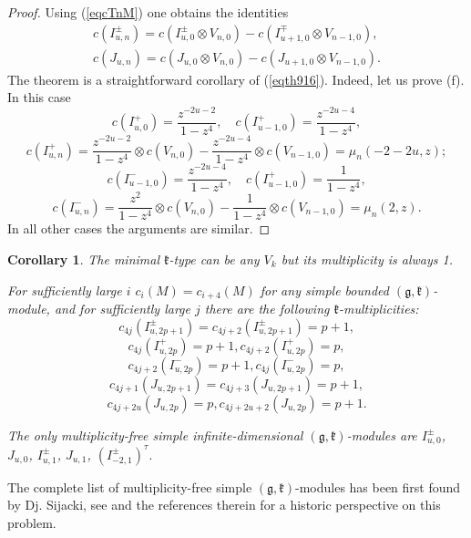 \documentclass[12pt]{amsart}
\theoremstyle{plain} %
\newtheorem{corollary}[definition]{Corollary}
\newcommand{\kk}{\mathfrak{k}}
\renewcommand{\gg}{\mathfrak{g}}
\newcommand{\refeq}[1]{(\ref{#1})}
\begin{document}
\begin{proof}
Using \refeq{eqcTnM} one obtains the identities
\begin{equation}\label{eqth916}
\begin{array}{l}
c(I^\pm_{u,n})=c(I^\pm_{u,0}\otimes V_{n,0})-c(I^\mp_{u+1,0}\otimes V_{n-1,0}),\\
c(J_{u,n})=c(J_{u,0}\otimes V_{n,0})-c(J_{u+1,0}\otimes V_{n-1,0}).
\end{array}
\end{equation}
The theorem is a straightforward corollary of \refeq{eqth916}. Indeed, let us prove (f). In this case
\[
c(I_{u,0}^+)=\frac{z^{-2u-2}}{1-z^4},\quad c(I_{u-1,0}^+)=\frac{z^{-2u-4}}{1-z^4},
\]
\[
c(I_{u,n}^+)=\frac{z^{-2u-2}}{1-z^4}\otimes c(V_{n,0})-\frac{z^{-2u-4}}{1-z^4}\otimes c(V_{n-1,0})=\mu_n(-2-2u,z);
\]
\[
c(I_{u-1,0}^-)=\frac{z^{-2u-4}}{1-z^4},\quad c(I_{u-1,0}^+)=\frac{1}{1-z^4},
\]
\[
c(I_{u,n}^-)=\frac{z^{2}}{1-z^4}\otimes c(V_{n,0})-\frac{1}{1-z^4}\otimes c(V_{n-1,0})=\mu_n(2,z).
\]
In all other cases the arguments are similar.
\end{proof}

\begin{corollary}
\item[(a)] The minimal $\kk$-type can be any $V_k$ but its multiplicity is always 1.
\item[(b)] For sufficiently large $i$ $c_i(M)=c_{i+4}(M)$ for any
  simple bounded $(\gg,\kk)$-module, and for sufficiently large $j$
  there are the following $\kk$-multiplicities:
\[
c_{4j}(I^\pm_{u,2p+1})=c_{4j+2}(I^\pm_{u,2p+1})=p+1,
\]
\[
c_{4j}(I^+_{u,2p})=p+1, c_{4j+2}(I^+_{u,2p})=p,
\]
\[
c_{4j+2}(I^-_{u,2p})=p+1, c_{4j}(I^-_{u,2p})=p,
\]
\[
c_{4j+1}(J_{u,2p+1})=c_{4j+3}(J_{u,2p+1})=p+1,
\]
\[
c_{4j+2u}(J_{u,2p})=p, c_{4j+2u+2}(J_{u,2p})=p+1.
\]
\item[(c)] The only multiplicity-free simple infinite-dimensional 
 $(\gg,\kk)$-modules are $I^\pm_{u,0}$, $J_{u,0}$, $I^\pm_{u,1}$,
 $J_{u,1}$, $(I^\pm_{-2,1})^\tau$.
\end{corollary}

The complete list of multiplicity-free simple $(\gg,\kk)$-modules has
been first found by Dj. Sijacki, see \cite{S} and the references
therein for a historic perspective on this problem. 
\end{document}
